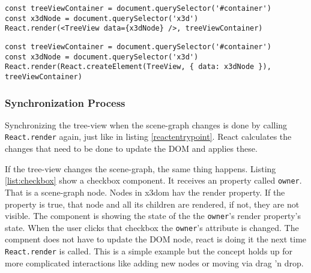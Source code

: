 \begin{listing}
  \begin{verbatim}
const treeViewContainer = document.querySelector('#container')
const x3dNode = document.querySelector('x3d')
React.render(<TreeView data={x3dNode} />, treeViewContainer)
  \end{verbatim}
  \caption{}
  \label{list:reactentrypoint}
\end{listing}

\begin{listing}
  \begin{verbatim}
const treeViewContainer = document.querySelector('#container')
const x3dNode = document.querySelector('x3d')
React.render(React.createElement(TreeView, { data: x3dNode }), treeViewContainer)
  \end{verbatim}
  \caption{}
  \label{list:}
\end{listing}

\subsubsection{Synchronization Process}
\label{synchronization-process}

Synchronizing the tree-view when the scene-graph changes is done by calling
\texttt{React.render} again, just like in listing \ref{reactentrypoint}. React
calculates the changes that need to be done to update the DOM and applies these.

If the tree-view changes the scene-graph, the same thing happens. Listing
\ref{list:checkbox} show a checkbox component. It receives an property called
\texttt{owner}. That is a scene-graph node. Nodes in x3dom hav the render
property. If the property is true, that node and all its children are rendered,
if not, they are not visible. The component is showing the state of the the
\texttt{owner}'s render property's state. When the user clicks that checkbox the
\texttt{owner}'s attribute is changed. The compnent does not have to update the
DOM node, react is doing it the next time \texttt{React.render} is called. This
is a simple example but the concept holds up for more complicated interactions
like adding new nodes or moving via drag 'n drop.

